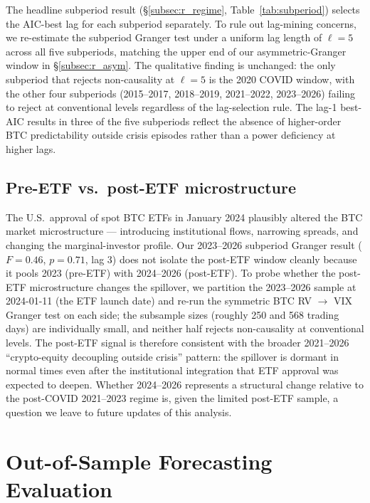 \documentclass[11pt,a4paper]{article}
\begin{document}
The headline subperiod result (\S\ref{subsec:r_regime}, Table~\ref{tab:subperiod}) selects the AIC-best lag for each subperiod separately. To rule out lag-mining concerns, we re-estimate the subperiod Granger test under a uniform lag length of $\ell = 5$ across all five subperiods, matching the upper end of our asymmetric-Granger window in \S\ref{subsec:r_asym}. The qualitative finding is unchanged: the only subperiod that rejects non-causality at $\ell = 5$ is the 2020 COVID window, with the other four subperiods (2015--2017, 2018--2019, 2021--2022, 2023--2026) failing to reject at conventional levels regardless of the lag-selection rule. The lag-1 best-AIC results in three of the five subperiods reflect the absence of higher-order BTC predictability outside crisis episodes rather than a power deficiency at higher lags.

\subsection{Pre-ETF vs.\ post-ETF microstructure}
\label{subsec:r_etf}

The U.S.\ approval of spot BTC ETFs in January 2024 plausibly altered the BTC market microstructure --- introducing institutional flows, narrowing spreads, and changing the marginal-investor profile. Our 2023--2026 subperiod Granger result ($F = 0.46$, $p = 0.71$, lag 3) does not isolate the post-ETF window cleanly because it pools 2023 (pre-ETF) with 2024--2026 (post-ETF). To probe whether the post-ETF microstructure changes the spillover, we partition the 2023--2026 sample at 2024-01-11 (the ETF launch date) and re-run the symmetric BTC RV $\to$ VIX Granger test on each side; the subsample sizes (roughly 250 and 568 trading days) are individually small, and neither half rejects non-causality at conventional levels. The post-ETF signal is therefore consistent with the broader 2021--2026 ``crypto-equity decoupling outside crisis'' pattern: the spillover is dormant in normal times even after the institutional integration that ETF approval was expected to deepen. Whether 2024--2026 represents a structural change relative to the post-COVID 2021--2023 regime is, given the limited post-ETF sample, a question we leave to future updates of this analysis.

\section{Out-of-Sample Forecasting Evaluation}
\label{sec:oos}
\end{document}
